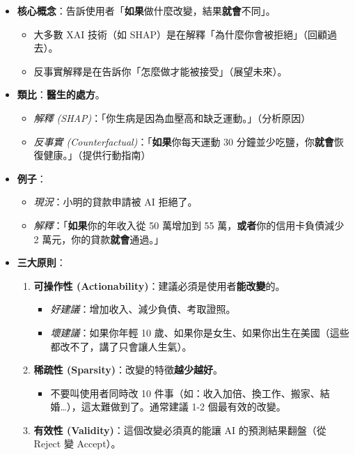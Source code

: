 \documentclass[
  letterpaper,
  DIV=11,
  numbers=noendperiod]{scrreprt}
\providecommand{\tightlist}{%
  \setlength{\itemsep}{0pt}\setlength{\parskip}{0pt}}
\begin{document}
\begin{itemize}
\tightlist
\item
  \textbf{核心概念}：告訴使用者「\textbf{如果}做什麼改變，結果\textbf{就會}不同」。

  \begin{itemize}
  \tightlist
  \item
    大多數 XAI 技術（如 SHAP）是在解釋「為什麼你會被拒絕」（回顧過去）。
  \item
    反事實解釋是在告訴你「怎麼做才能被接受」（展望未來）。
  \end{itemize}
\item
  \textbf{類比}：\textbf{醫生的處方}。

  \begin{itemize}
  \tightlist
  \item
    \emph{解釋 (SHAP)}：「你生病是因為血壓高和缺乏運動。」（分析原因）
  \item
    \emph{反事實 (Counterfactual)}：「\textbf{如果}你每天運動 30
    分鐘並少吃鹽，你\textbf{就會}恢復健康。」（提供行動指南）
  \end{itemize}
\item
  \textbf{例子}：

  \begin{itemize}
  \tightlist
  \item
    \emph{現況}：小明的貸款申請被 AI 拒絕了。
  \item
    \emph{解釋}：「\textbf{如果}你的年收入從 50 萬增加到 55
    萬，\textbf{或者}你的信用卡負債減少 2
    萬元，你的貸款\textbf{就會}通過。」
  \end{itemize}
\item
  \textbf{三大原則}：

  \begin{enumerate}
  \def\labelenumi{\arabic{enumi}.}
  \tightlist
  \item
    \textbf{可操作性
    (Actionability)}：建議必須是使用者\textbf{能改變}的。

    \begin{itemize}
    \tightlist
    \item
      \emph{好建議}：增加收入、減少負債、考取證照。
    \item
      \emph{壞建議}：如果你年輕 10
      歲、如果你是女生、如果你出生在美國（這些都改不了，講了只會讓人生氣）。
    \end{itemize}
  \item
    \textbf{稀疏性 (Sparsity)}：改變的特徵\textbf{越少越好}。

    \begin{itemize}
    \tightlist
    \item
      不要叫使用者同時改 10
      件事（如：收入加倍、換工作、搬家、結婚\ldots），這太難做到了。通常建議
      1-2 個最有效的改變。
    \end{itemize}
  \item
    \textbf{有效性 (Validity)}：這個改變必須真的能讓 AI
    的預測結果翻盤（從 Reject 變 Accept）。
  \end{enumerate}
\end{itemize}
\end{document}
